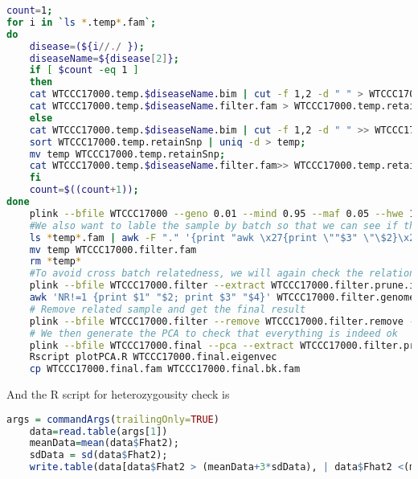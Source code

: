 \documentclass[12pt]{article}
\begin{document}
	\begin{lstlisting}[language=bash]
	count=1;
for i in `ls *.temp*.fam`;
do
	disease=(${i//./ });
	diseaseName=${disease[2]};
	if [ $count -eq 1 ] 
	then
	cat WTCCC17000.temp.$diseaseName.bim | cut -f 1,2 -d " " > WTCCC17000.temp.retainSnp;
	cat WTCCC17000.temp.$diseaseName.filter.fam > WTCCC17000.temp.retainSample;
	else
	cat WTCCC17000.temp.$diseaseName.bim | cut -f 1,2 -d " " >> WTCCC17000.temp.retainSnp;
	sort WTCCC17000.temp.retainSnp | uniq -d > temp;
	mv temp WTCCC17000.temp.retainSnp;
	cat WTCCC17000.temp.$diseaseName.filter.fam>> WTCCC17000.temp.retainSample;
	fi
	count=$((count+1));
done
	plink --bfile WTCCC17000 --geno 0.01 --mind 0.95 --maf 0.05 --hwe 1e-5 --keep WTCCC17000.temp.retainSample --extract WTCCC17000.temp.retainSnp --make-bed --out WTCCC17000.filter --indep 50 5 2 --threads 10
	#We also want to lable the sample by batch so that we can see if there is any batch problem
	ls *temp*.fam | awk -F "." '{print "awk \x27{print \""$3" \"\$2}\x27 "$0}' | bash |  awk 'NR==FNR{a[$2]=$1} NR!=FNR{print a[$2]" "$2" "$3" "$4" "$5" "$6}' - WTCCC17000.filter.fam > temp
	mv temp WTCCC17000.filter.fam
	rm *temp*
	#To avoid cross batch relatedness, we will again check the relationship between the samlpes
	plink --bfile WTCCC17000.filter --extract WTCCC17000.filter.prune.in --genome --min 0.125 --out WTCCC17000.filter --threads 10 
	awk 'NR!=1 {print $1" "$2; print $3" "$4}' WTCCC17000.filter.genome | sort | uniq > WTCCC17000.filter.remove;
	# Remove related sample and get the final result
	plink --bfile WTCCC17000.filter --remove WTCCC17000.filter.remove --threads 10 --geno 0.01 --mind 0.95 --maf 0.05 --hwe 1e-5 --make-bed --out WTCCC17000.final
	# We then generate the PCA to check that everything is indeed ok
	plink --bfile WTCCC17000.final --pca --extract WTCCC17000.filter.prune.in --out WTCCC17000.final --threads 10
	Rscript plotPCA.R WTCCC17000.final.eigenvec
	cp WTCCC17000.final.fam WTCCC17000.final.bk.fam
	\end{lstlisting}

	
	And the R script for heterozygousity check is
	\begin{lstlisting}[language=R]
	args = commandArgs(trailingOnly=TRUE)
	data=read.table(args[1])
	meanData=mean(data$Fhat2);
	sdData = sd(data$Fhat2);
	write.table(data[data$Fhat2 > (meanData+3*sdData), | data$Fhat2 <(meanData-3*sdData) ], args[2], quote=F, row.names=F, col.names=F)
	\end{lstlisting}
	
\end{document}
